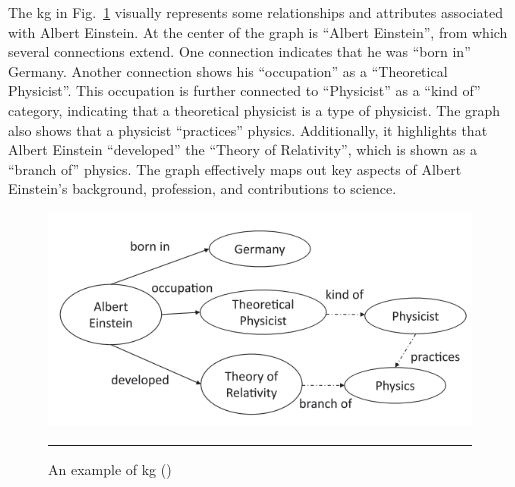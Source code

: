 The \gls{kg} in Fig.~\ref{fig:kg-example-albert-einstein} visually represents some relationships and attributes associated with Albert Einstein.
At the center of the graph is ``Albert Einstein'', from which several connections extend.
One connection indicates that he was ``born in'' Germany.
Another connection shows his ``occupation'' as a ``Theoretical Physicist''.
This occupation is further connected to ``Physicist'' as a ``kind of'' category, indicating that a theoretical physicist is a type of physicist.
The graph also shows that a physicist ``practices'' physics.
Additionally, it highlights that Albert Einstein ``developed'' the ``Theory of Relativity'', which is shown as a ``branch of'' physics.
The graph effectively maps out key aspects of Albert Einstein's background, profession, and contributions to science.

\begin{figure}[htbp]
    \centering
 \includegraphics[width=.7\textwidth]{03_Figures/literature-review/kg-example-albert-einstein.png}
     \rule{35em}{0.5pt}
    \caption{An example of \acrlong{kg} (\textcite{Chaudhri2022})} 
 \label{fig:kg-example-albert-einstein}
\end{figure}

